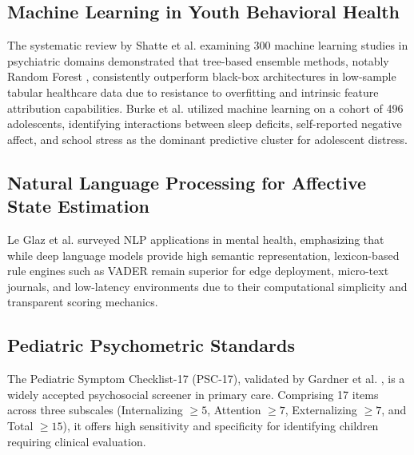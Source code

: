 \documentclass[conference]{IEEEtran}
\begin{document}
\subsection{Machine Learning in Youth Behavioral Health}
The systematic review by Shatte et al. \cite{shatte2019machine} examining 300 machine learning studies in psychiatric domains demonstrated that tree-based ensemble methods, notably Random Forest \cite{breiman2001random}, consistently outperform black-box architectures in low-sample tabular healthcare data due to resistance to overfitting and intrinsic feature attribution capabilities. Burke et al. \cite{burke2019identifying} utilized machine learning on a cohort of 496 adolescents, identifying interactions between sleep deficits, self-reported negative affect, and school stress as the dominant predictive cluster for adolescent distress.

\subsection{Natural Language Processing for Affective State Estimation}
Le Glaz et al. \cite{leglaz2021machine} surveyed NLP applications in mental health, emphasizing that while deep language models provide high semantic representation, lexicon-based rule engines such as VADER \cite{hutto2014vader} remain superior for edge deployment, micro-text journals, and low-latency environments due to their computational simplicity and transparent scoring mechanics.

\subsection{Pediatric Psychometric Standards}
The Pediatric Symptom Checklist-17 (PSC-17), validated by Gardner et al. \cite{gardner1999psc17}, is a widely accepted psychosocial screener in primary care. Comprising 17 items across three subscales (Internalizing $\ge 5$, Attention $\ge 7$, Externalizing $\ge 7$, and Total $\ge 15$), it offers high sensitivity and specificity for identifying children requiring clinical evaluation.
\end{document}
